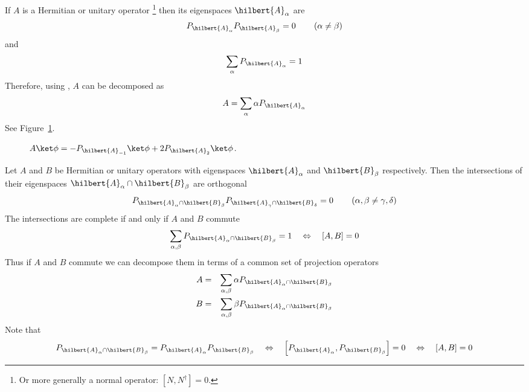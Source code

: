\documentclass[a4paper,12pt]{report}
\begin{document}
If $A$ is a Hermitian or unitary operator
\footnote{Or more generally a normal operator: $[N,N^\dagger]=0$.}
then its eigenspaces $\hilbert{A}_\alpha$ are 
\begin{equation}
P_{\hilbert{A}_\alpha} P_{\hilbert{A}_\beta} = 0
\qquad \left( \alpha \neq \beta \right)
\end{equation}
and 
\begin{equation}
\sum_\alpha P_{\hilbert{A}_\alpha} = 1
\end{equation}
Therefore, using , $A$ can be decomposed as
\begin{equation}
A = \sum_\alpha \alpha P_{\hilbert{A}_\alpha}
\end{equation}
See Figure~\ref{fig:eigenspace}.
\begin{figure}
\centering
{}
\caption{ \label{fig:eigenspace}
$A \ket\phi = - P_{\hilbert{A}_{-1}} \ket\phi + 2 P_{\hilbert{A}_{2}} \ket\phi$.
}
\end{figure}

Let $A$ and $B$ be Hermitian or unitary operators with eigenspaces $\hilbert{A}_\alpha$ and $\hilbert{B}_\beta$ respectively.
Then the intersections of their eigenspaces $\hilbert{A}_\alpha \cap \hilbert{B}_\beta$ are orthogonal
\begin{equation}
P_{\hilbert{A}_\alpha \cap \hilbert{B}_\beta} P_{\hilbert{A}_\gamma \cap \hilbert{B}_\delta} = 0
\qquad \left( \alpha,\beta \neq \gamma,\delta \right)
\end{equation}
The intersections are complete if and only if $A$ and $B$ commute
\begin{equation}
\sum_{\alpha,\beta} P_{\hilbert{A}_\alpha \cap \hilbert{B}_\beta} = 1
\quad \Leftrightarrow \quad
[A,B] = 0
\end{equation}
Thus if $A$ and $B$ commute we can decompose them in terms of a common set of projection operators
\begin{eqnarray}
A & = & \sum_{\alpha,\beta} \alpha P_{\hilbert{A}_\alpha \cap \hilbert{B}_\beta}
\\
B & = & \sum_{\alpha,\beta} \beta P_{\hilbert{A}_\alpha \cap \hilbert{B}_\beta}
\end{eqnarray}
Note that
\begin{equation}
P_{\hilbert{A}_\alpha \cap \hilbert{B}_\beta} = P_{\hilbert{A}_\alpha} P_{\hilbert{B}_\beta}
\quad \Leftrightarrow \quad
\left[ P_{\hilbert{A}_\alpha} , P_{\hilbert{B}_\beta} \right] = 0
\quad \Leftrightarrow \quad
\left[ A , B \right] = 0
\end{equation}
\end{document}
